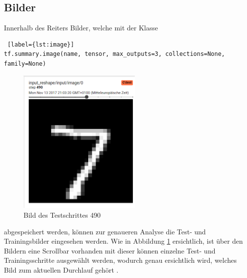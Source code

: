 \subsection{Bilder}

Innerhalb des Reiters Bilder, welche mit der Klasse

\vspace{0.6cm}
\begin{minipage}{\linewidth}
\begin{lstlisting} [label={lst:image}]
tf.summary.image(name, tensor, max_outputs=3, collections=None, family=None)
\end{lstlisting}
\end{minipage}
\vspace{0.3cm}

\begin{figure}[htb!]
	\centering
     \includegraphics[width=6cm]{images/Kapitel_3/images.png}
	\vspace{10pt} 
	\caption{Bild des Testschrittes 490}
	\label{fig:TensorBoard_image}
\end{figure}

abgespeichert werden, können zur genaueren Analyse die Test- und Trainingsbilder eingesehen werden. Wie in Abbildung \ref{fig:TensorBoard_image} ersichtlich, ist über den Bildern eine Scrollbar vorhanden mit dieser können einzelne Test- und Trainingsschritte ausgewählt werden, wodurch genau ersichtlich wird, welches Bild zum aktuellen Durchlauf gehört \cite{tensorboard.2017}.
\vspace{50pt}
\newpage


